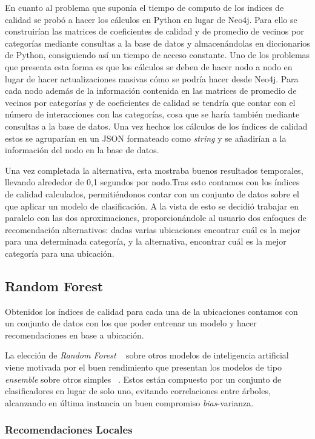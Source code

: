 En cuanto al problema que suponía el tiempo de computo de los indices de calidad se probó a hacer los cálculos en Python en lugar de Neo4j. Para ello se construirían las matrices de coeficientes de calidad y de promedio de vecinos por categorías mediante consultas a la base de datos y almacenándolas en diccionarios de Python, consiguiendo así un tiempo de acceso constante. Uno de los problemas que presenta esta forma es que los cálculos se deben de hacer nodo a nodo en lugar de hacer actualizaciones masivas cómo se podría hacer desde Neo4j. Para cada nodo además de la información contenida en las matrices de promedio de vecinos por categorías y de coeficientes de calidad se tendría que contar con el número de interacciones con las categorías, cosa que se haría también mediante consultas a la base de datos. Una vez hechos los cálculos de los índices de calidad estos se agruparían en un JSON formateado como \textit{string} y se añadirían a la información del nodo en la base de datos.

Una vez completada la alternativa, esta mostraba buenos resultados temporales, llevando alrededor de 0,1 segundos por nodo.Tras esto contamos con los índices de calidad calculados,
permitiéndonos contar con un conjunto de datos sobre el que aplicar un modelo de clasificación. A la vista de esto se decidió trabajar en paralelo con las dos aproximaciones, proporcionándole al usuario dos enfoques de recomendación alternativos: dadas varias ubicaciones encontrar cuál es la mejor para una determinada categoría, y la alternativa, encontrar cuál es la mejor categoría para una ubicación. 

\subsection{Random Forest}


Obtenidos los índices de calidad para cada una de la ubicaciones contamos con un conjunto de datos con los que poder entrenar un modelo y hacer recomendaciones en base a ubicación.

La elección de \textit{Random Forest} ~\cite{RF} sobre otros modelos de inteligencia artificial viene motivada por el buen rendimiento que presentan los modelos de tipo \textit{ensemble} sobre otros simples ~\cite{Ahedo2021, HundredClass}. Estos están compuesto por un conjunto de clasificadores en lugar de solo uno, evitando correlaciones entre árboles, alcanzando en última instancia un buen compromiso \textit{bias}-varianza.

\subsubsection{Recomendaciones Locales}

